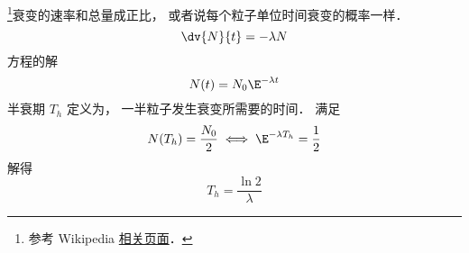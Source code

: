 
\begin{issues}
\issueDraft
\end{issues}


\footnote{参考 Wikipedia \href{https://en.wikipedia.org/wiki/Exponential_decay}{相关页面}．}衰变的速率和总量成正比， 或者说每个粒子单位时间衰变的概率一样．
\begin{equation}
\dv{N}{t} = -\lambda N
\end{equation}
方程的解
\begin{equation}
N(t) = N_0 \E^{-\lambda t}
\end{equation}
半衰期 $T_h$ 定义为， 一半粒子发生衰变所需要的时间． 满足
\begin{equation}
N(T_h) = \frac{N_0}{2} \iff \E^{-\lambda T_h} = \frac{1}{2}
\end{equation}
解得
\begin{equation}
T_h = \frac{\ln 2}{\lambda}
\end{equation}
